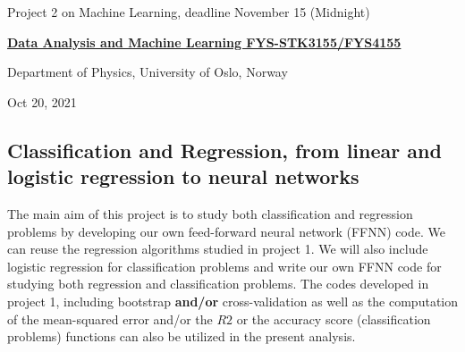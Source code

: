 \documentclass[%
oneside,                 %
final,                   %
10pt]{article}
\begin{document}

\newcommand{\exercisesection}[1]{\subsection*{#1}}






\thispagestyle{empty}

\begin{center}
{\LARGE\bf
\begin{spacing}{1.25}
Project 2 on Machine Learning, deadline November 15 (Midnight)
\end{spacing}
}
\end{center}


\begin{center}
{\bf \href{{http://www.uio.no/studier/emner/matnat/fys/FYS3155/index-eng.html}}{Data Analysis and Machine Learning FYS-STK3155/FYS4155}}
\end{center}

    \begin{center}
\centerline{{\small Department of Physics, University of Oslo, Norway}}
\end{center}
    

\begin{center}
Oct 20, 2021
\end{center}

\vspace{1cm}


\subsection{Classification and Regression, from linear and logistic regression to neural networks}

The main aim of this project is to study both classification and
regression problems by developing our own feed-forward neural network (FFNN) code. We can reuse the regression algorithms studied
in project 1. We will also include logistic regression for classification
problems and write our own FFNN code for studying
both regression and classification problems.  The codes developed in
project 1, including bootstrap \textbf{and/or} cross-validation as well as the
computation of the mean-squared error and/or the $R2$ or the accuracy score (classification problems) functions can
also be utilized in the present analysis. 
\end{document}
